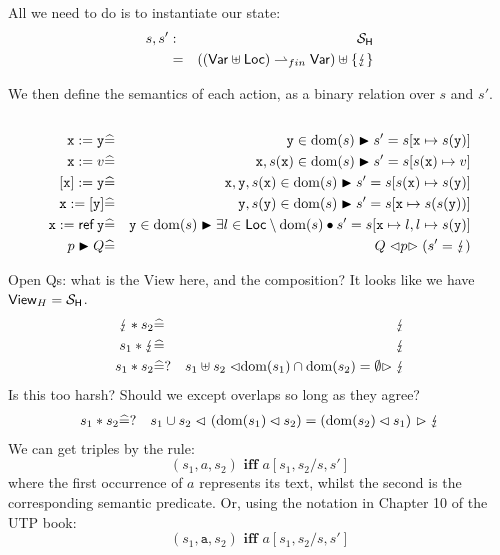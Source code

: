All we need to do is to instantiate our state:
\begin{eqnarray*}
  s,s' &:& \mathcal{S}_{\mathsf{H}}
\\ &=& ((\mathsf{Var} \uplus \mathsf{Loc}) \rightharpoonup_{fin} \mathsf{Var}) \uplus \{\lightning\}
\end{eqnarray*}


We then define the semantics of each action,
as a binary relation over $s$ and $s'$.
\begin{eqnarray*}
\\ \mathtt{x}:=\mathtt{y}
   &\widehat=& \mathtt{y} \in \mathrm{dom}(s) \blacktriangleright
           s' = s[\mathtt{x} \mapsto s(\mathtt{y})]
\\ \mathtt{x}:=v
   &\widehat=& \mathtt{x},s(\mathtt{x}) \in \mathrm{dom}(s) \blacktriangleright
           s' = s[s(\mathtt{x}) \mapsto v]
\\ ~[\mathtt{x}]:=\mathtt{y}
   &\widehat=& \mathtt{x},\mathtt{y},s(\mathtt{x}) \in \mathrm{dom}(s) \blacktriangleright
           s' = s[s(\mathtt{x}) \mapsto s(\mathtt{y})]
\\ \mathtt{x}:=[\mathtt{y}]
   &\widehat=& \mathtt{y},s(\mathtt{y}) \in \mathrm{dom}(s) \blacktriangleright
           s' = s[\mathtt{x} \mapsto s(s(\mathtt{y}))]
\\ \mathtt{x}:=\mathop{\mathsf{ref}}\mathtt{y}
              &\widehat=& \mathtt{y} \in \mathrm{dom}(s) \blacktriangleright
              \exists l \in \mathsf{Loc} \setminus \mathrm{dom}(s) \bullet
               s' = s[\mathtt{x} \mapsto l,l \mapsto s(\mathtt{y})]
\\ p \blacktriangleright Q &\widehat=& Q \mathrel{\lhd{p}\rhd} ( s'=\lightning )
\end{eqnarray*}

Open Qs: what is the View here, and the composition?
It looks like we have $\mathsf{View}_{H} = \mathcal{S}_{\mathsf{H}}$.
\begin{eqnarray*}
   \lightning * s_2 &\widehat=& \lightning
\\ s_1 * \lightning &\widehat=& \lightning
\\  s_1 * s_2
   &\widehat=?& s_1
   \uplus s_2
   \mathrel{\lhd{\mathrm{dom}(s_1)\cap\mathrm{dom}(s_2)=\emptyset}\rhd}
   \lightning
\end{eqnarray*}
Is this too harsh?
Should we except overlaps so long as they agree?
\begin{eqnarray*}
   s_1 * s_2
   &\widehat=?& s_1
   \cup s_2
   \mathrel{\lhd{~(\mathrm{dom}(s_1)\lhd s_2) = (\mathrm{dom}(s_2)\lhd s_1)~}\rhd}
   \lightning
\end{eqnarray*}
We can get triples by the rule:
\[
  (s_1,a,s_2) \textbf{ iff } a[s_1,s_2/s,s']
\]
where the first occurrence of $a$ represents its text,
whilst the second is the corresponding semantic predicate.
Or, using the notation in Chapter 10 of the UTP book:
\[
  (s_1,\texttt{a},s_2) \textbf{ iff } a[s_1,s_2/s,s']
\]
